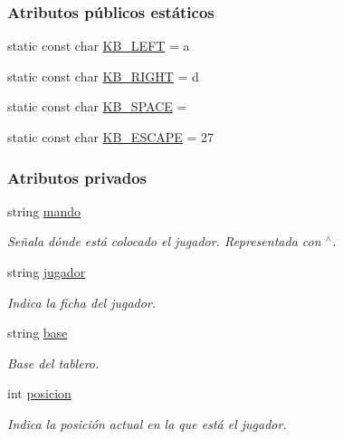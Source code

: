 \subsubsection*{Atributos públicos estáticos}
\begin{DoxyCompactItemize}
\item 
static const char \hyperlink{classMando_a61277e93015f5d44d37416f1475be542}{K\+B\+\_\+\+L\+E\+FT} = \textquotesingle{}a\textquotesingle{}
\item 
static const char \hyperlink{classMando_a75b32aa31a64931f62c5737b8f09bf39}{K\+B\+\_\+\+R\+I\+G\+HT} = \textquotesingle{}d\textquotesingle{}
\item 
static const char \hyperlink{classMando_ade68606cf2abf043c08e281d1531c78a}{K\+B\+\_\+\+S\+P\+A\+CE} = \textquotesingle{} \textquotesingle{}
\item 
static const char \hyperlink{classMando_a3c4e7465d5b25fcaf8f3b50b444421a3}{K\+B\+\_\+\+E\+S\+C\+A\+PE} = 27
\end{DoxyCompactItemize}
\subsubsection*{Atributos privados}
\begin{DoxyCompactItemize}
\item 
string \hyperlink{classMando_a156e71bce6ea523dccbce03021bee4dd}{mando}
\begin{DoxyCompactList}\small\item\em Señala dónde está colocado el jugador. Representada con \textquotesingle{}$^\wedge$\textquotesingle{}. \end{DoxyCompactList}\item 
string \hyperlink{classMando_ab4791c4f5bb306c1bbcf95047e010163}{jugador}
\begin{DoxyCompactList}\small\item\em Indica la ficha del jugador. \end{DoxyCompactList}\item 
string \hyperlink{classMando_ad914a93d7fb6c085a26d5d70bbb7fecd}{base}
\begin{DoxyCompactList}\small\item\em Base del tablero. \end{DoxyCompactList}\item 
int \hyperlink{classMando_a7971a6eaa8b936977be7460ffa28530f}{posicion}
\begin{DoxyCompactList}\small\item\em Indica la posición actual en la que está el jugador. \end{DoxyCompactList}\end{DoxyCompactItemize}


